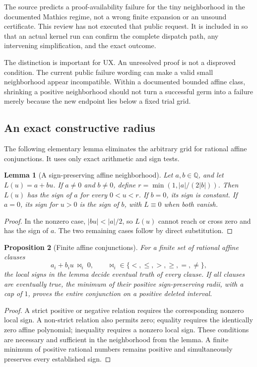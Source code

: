 \documentclass[11pt,a4paper]{article}
\newcommand{\code}[1]{\texttt{\detokenize{#1}}}
\newtheorem{proposition}{Proposition}[section]
\newtheorem{lemma}[proposition]{Lemma}
\begin{document}
The source predicts a proof-availability failure for the tiny neighborhood in
the documented Mathics regime, not a wrong finite expansion or an unsound
certificate. This review has not executed that public request. It is included
in \code{tests/ProbeNewReview.wl} so that an actual kernel run can confirm the
complete dispatch path, any intervening simplification, and the exact outcome.

The distinction is important for UX. An unresolved proof is not a disproved
condition. The current public failure wording can make a valid small
neighborhood appear incompatible. Within a documented bounded affine class,
shrinking a positive neighborhood should not turn a successful germ into a
failure merely because the new endpoint lies below a fixed trial grid.

\subsection{An exact constructive radius}

The following elementary lemma eliminates the arbitrary grid for rational
affine conjunctions. It uses only exact arithmetic and sign tests.

\begin{lemma}[A sign-preserving affine neighborhood]
Let $a,b\in\mathbb Q$, and let $L(u)=a+bu$. If $a\ne0$ and $b\ne0$, define
$r=\min(1,|a|/(2|b|))$. Then $L(u)$ has the sign of $a$ for every
$0<u<r$. If $b=0$, its sign is constant. If $a=0$, its sign for $u>0$ is the
sign of $b$, with $L\equiv0$ when both vanish.
\end{lemma}
\begin{proof}
In the nonzero case, $|bu|<|a|/2$, so $L(u)$ cannot reach or cross zero and
has the sign of $a$. The two remaining cases follow by direct substitution.
\end{proof}

\begin{proposition}[Finite affine conjunctions]
For a finite set of rational affine clauses
\[
 a_i+b_i u\ \mathrel{\bowtie_i}\ 0,
 \qquad \bowtie_i\in\{<,\le,>,\ge,=,\ne\},
\]
the local signs in the lemma decide eventual truth of every clause. If all
clauses are eventually true, the minimum of their positive sign-preserving
radii, with a cap of $1$, proves the entire conjunction on a positive deleted
interval.
\end{proposition}
\begin{proof}
A strict positive or negative relation requires the corresponding nonzero
local sign. A non-strict relation also permits zero; equality requires the
identically zero affine polynomial; inequality requires a nonzero local sign.
These conditions are necessary and sufficient in the neighborhood from the
lemma. A finite minimum of positive rational numbers remains positive and
simultaneously preserves every established sign.
\end{proof}
\end{document}
